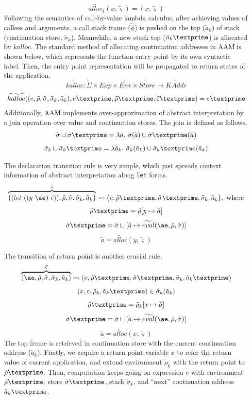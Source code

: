 \documentclass[12pt]{report}
\begin{document}
\[
\widetilde{alloc_1} (x, \tilde{\varsigma}) = (x, \tilde{\varsigma})
\]
Following the semantics of call-by-value lambda calculus, after achieving values of callees and arguments, a call stack frame ($\widetilde{\phi}$) is pushed on the top ($\tilde{a}_k$) of stack (continuation store, $\tilde{\sigma}_k$).
Meanwhile, a new stack top ($\tilde{a}_k\textprime$) is allocated by $\widetilde{kalloc}$.
The standard method of allocating continuation addresses in AAM is shown below, which represents the function entry point by its own syntactic label. Then, the entry point representation will be propagated to return states of the application.
\[
\widetilde{kalloc} : \tilde{\Sigma} \times Exp \times \widetilde{Env} \times \widetilde{Store} \to \widetilde{KAddr}
\]
\[
\widetilde{kalloc}((e, \tilde{\rho}, \tilde{\sigma}, \tilde{\sigma}_k, \tilde{a}_k), e\textprime, \tilde{\rho}\textprime, \tilde{\varsigma}\textprime) = e\textprime
\]
Additionally, AAM implements over-approximation of abstract interpretation by a join operation over value and continuation stores.
The join is defined as follows.
\[
\tilde{\sigma} \sqcup \tilde{\sigma}\textprime = \lambda \tilde{a}.\ \tilde{\sigma}(\tilde{a}) \cup \tilde{\sigma}\textprime(\tilde{a})
\]
\[
\tilde{\sigma}_k \sqcup \tilde{\sigma}_k\textprime = \lambda \tilde{a}_k.\ \tilde{\sigma}_k(\tilde{a}_k) \cup \tilde{\sigma}_k\textprime(\tilde{a}_k)
\]

The declaration transition rule is very simple, which just spreads context information of abstract interpretation along \verb|let| forms.
\[
\overbrace{
\big((let\ ((y\ \ae)\ e)), \tilde{\rho}, \tilde{\sigma}, \tilde{\sigma}_k, \tilde{a}_k \big)
}^{\tilde{\varsigma}}
\leadsto \big(e,\tilde{\rho}\textprime, \tilde{\sigma}\textprime, \tilde{\sigma}_k, \tilde{a}_k \big), \mbox{ where}
\]
\[
\tilde{\rho}\textprime = \tilde{\rho}[y \mapsto \tilde{a}]
\]
\[
\tilde{\sigma}\textprime = \tilde{\sigma} \sqcup [\tilde{a} \mapsto \widetilde{eval}(\ae, \tilde{\rho}, \tilde{\sigma})]
\]
\[
\tilde{a} = \widetilde{alloc}(y, \tilde{\varsigma})
\]

The transition of return point is another crucial rule.
\[
\overbrace{
(\ae, \tilde{\rho}, \tilde{\sigma}, \tilde{\sigma}_k, \tilde{a}_k)
}^{\tilde{\varsigma}}
\leadsto (e, \tilde{\rho}\textprime, \tilde{\sigma}\textprime, \tilde{\sigma}_k, \tilde{a}_k\textprime)
\]
\[
(x, e, \tilde{\rho}_k, \tilde{a}_k\textprime) \in \tilde{\sigma}_k(\tilde{a}_k)
\]
\[
\tilde{\rho}\textprime = \tilde{\rho}_k[x \mapsto \tilde{a}]
\]
\[
\tilde{\sigma}\textprime = \tilde{\sigma} \sqcup [\tilde{a} \mapsto \widetilde{eval}(\ae, \tilde{\rho}, \tilde{\sigma})]
\]
\[
\tilde{a} = \widetilde{alloc}(x, \tilde{\varsigma})
\]
The top frame is retrieved in continuation store with the current continuation address ($\tilde{a}_k$).
Firstly, we acquire a return point variable $x$ to refer the return value of current application, and extend environment $\tilde{\rho}_k$ with the return point to $\tilde{\rho}\textprime$.
Then, computation keeps going on expression $e$ with environment $\tilde{\rho}\textprime$, store $\tilde{\sigma}\textprime$, stack $\tilde{\sigma}_k$, and ``next'' continuation address $\tilde{a}_k\textprime$.
\end{document}
